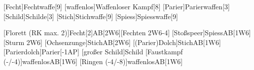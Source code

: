 \documentclass{m5figur-mv}[2014/12/31]
\begin{document}
{[Fecht]{Fechtwaffe}[9]
[waffenlos]{Waffenloser Kampf}[8]
[Parier]{Parierwaffen}[3]
[Schild]{Schilde}[3]
[Stich]{Stichwaffe}[9]
[Spiess]{Spiesswaffe}[9]


[Florett (RK max. 2)]{Fecht}[2]{AB}[2W6][Fechten 2W6-4]
[Stoßspeer]{Spiess}{AB}[1W6\PlusSB{}][Sturm 2W6\PlusSB{}]
[Ochsenzunge]{Stich}{AB}[2W6]
[(Parier)Dolch]{Stich}{AB}[1W6]
[Parierdolch]{Parier}{}[-1AP]
[großer Schild]{Schild}{}
[Faustkampf (-/-4)]{waffenlos}{AB}[1W6]
[Ringen (-4/-8)]{waffenlos}{AB}[1W6]









}%

\end{document}
